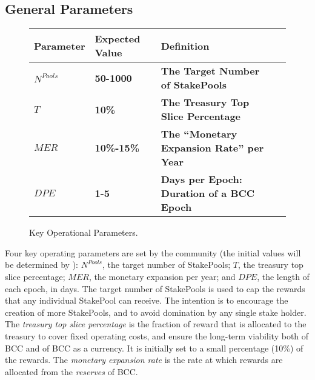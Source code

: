 \documentclass[11pt,a4paper,dvipsnames,twosided,final]{article}
\newcommand{\bcc}{BCC{}}
\newcommand{\bcc}[1]{Bcc}
\begin{document}
\subsection{General Parameters}

\begin{figure}[h!]
\begin{center}
\begin{tabular}{||l|l|p{10cm}|l||}
  \hline \hline
\textbf{Parameter} & \textbf{Expected Value} & \textbf{Definition} \\\hline
\textbf{\color{green} $N^{\textit{Pools}}$} &\textbf{\color{green}  50-1000} & \textbf{\color{green} The Target Number of StakePools} \\\hline
\textbf{\color{green} $T$ } & \textbf{\color{green}  10\% } & \textbf{\color{green}  The Treasury Top Slice Percentage } \\\hline
\textbf{\color{green} $\textit{MER}$ } & \textbf{\color{green}  10\%-15\% } & \textbf{\color{green}   The ``Monetary Expansion Rate'' per Year } \\\hline
\textbf{\color{green} $\textit{DPE}$ } & \textbf{\color{green}  1-5 } & \textbf{\color{green}   Days per Epoch: Duration of a \bcc{} Epoch } \\\hline
  \hline
\end{tabular}
\end{center}
\caption{Key Operational Parameters.}
\end{figure}

\noindent
Four key operating parameters are set by the community (the initial values will be determined by \TBCO):
$N^{\textit{Pools}}$, the target number of StakePools;
$T$, the treasury top slice percentage;
$\textit{MER}$, the monetary expansion per year;
and
$\textit{DPE}$, the length of each epoch, in days.
%
The target number of StakePools is used to cap the rewards that any individual StakePool can receive. The intention is to encourage the creation of more StakePools, and to avoid domination by any single stake holder.
The \emph{treasury top slice percentage} is the fraction of reward that is allocated to the treasury to cover fixed operating costs, and
ensure the long-term viability both of \bcc{} and of \bcc{} as a currency.  It is initially set to a small percentage (10\%) of the rewards.
The \emph{monetary expansion rate} is the rate at which rewards are allocated from the \emph{reserves} of \bcc{}.
\end{document}
